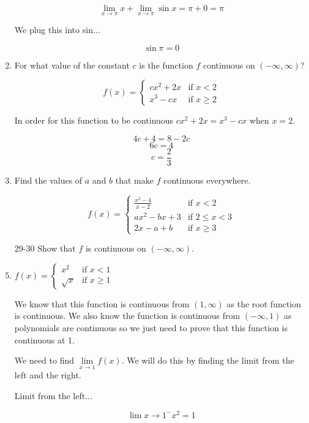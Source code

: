 \documentclass{article}
\begin{document}
\begin{enumerate}
			$$\lim \limits _{x \to \pi} x + \lim \limits _{x \to \pi} \sin x 
				= \pi + 0 = \pi$$

			We plug this into sin...
		
			$$\sin \pi = 0$$

			\item For what value of the constant $c$ is the function $f$ continuous on $(-\infty, \infty)$?

				$$f(x) = 
				\begin{cases}
					cx^2 + 2x & \text{if } x < 2 \\
					x^3 - cx & \text{if } x \geq 2
				\end{cases}$$

				In order for this function to be continuous $cx^2 + 2x = x^3 - cx$ when $x = 2$.

				$$4c + 4 = 8 - 2c$$
				$$6c = 4$$
				$$c = \frac{2}{3}$$

			\item Find the values of $a$ and $b$ that make $f$ continuous everywhere.

				$$f(x) = 
					\begin{cases}
						\frac{x^2 - 4}{x-2} & \text{if } x < 2 \\
						ax^2 - bx + 3 & \text{if } 2 \leq x < 3 \\
						2x - a + b & \text{if } x \geq 3
					\end{cases}$$

			\item[29-30] Show that $f$ is continuous on $(-\infty, \infty)$.

			\item $f(x) = 
				\begin{cases}
					x^2 & \text{if } x < 1 \\
					\sqrt{x} & \text{if } x \geq 1
				\end{cases}$ 

				We know that this function is continuous from $(1, \infty)$ as the root
				function is continuous. We also know the function is continuous from
				$(-\infty, 1)$ as polynomials are continuous so we just need to prove that
				this function is continuous at 1.

				We need to find $\lim \limits _{x \to 1} f(x)$. We will do this by finding the
				limit from the left and the right.

				Limit from the left...

				$$\lim \limits {x \to 1^{-}} x^2 = 1$$
				


\end{enumerate}
\end{document}
